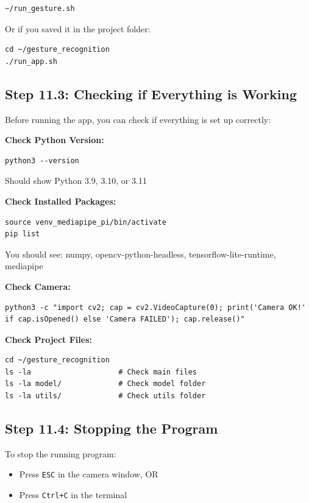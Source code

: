 \documentclass[12pt,a4paper]{article}
\begin{document}
\begin{lstlisting}
~/run_gesture.sh
\end{lstlisting}

Or if you saved it in the project folder:
\begin{lstlisting}
cd ~/gesture_recognition
./run_app.sh
\end{lstlisting}

\subsection{Step 11.3: Checking if Everything is Working}

Before running the app, you can check if everything is set up correctly:

\textbf{Check Python Version:}
\begin{lstlisting}
python3 --version
\end{lstlisting}
Should show Python 3.9, 3.10, or 3.11

\textbf{Check Installed Packages:}
\begin{lstlisting}
source venv_mediapipe_pi/bin/activate
pip list
\end{lstlisting}
You should see: numpy, opencv-python-headless, tensorflow-lite-runtime, mediapipe

\textbf{Check Camera:}
\begin{lstlisting}
python3 -c "import cv2; cap = cv2.VideoCapture(0); print('Camera OK!' if cap.isOpened() else 'Camera FAILED'); cap.release()"
\end{lstlisting}

\textbf{Check Project Files:}
\begin{lstlisting}
cd ~/gesture_recognition
ls -la                    # Check main files
ls -la model/             # Check model folder
ls -la utils/             # Check utils folder
\end{lstlisting}

\subsection{Step 11.4: Stopping the Program}

To stop the running program:
\begin{itemize}
    \item Press \texttt{ESC} in the camera window, OR
    \item Press \texttt{Ctrl+C} in the terminal
\end{itemize}
\end{document}

